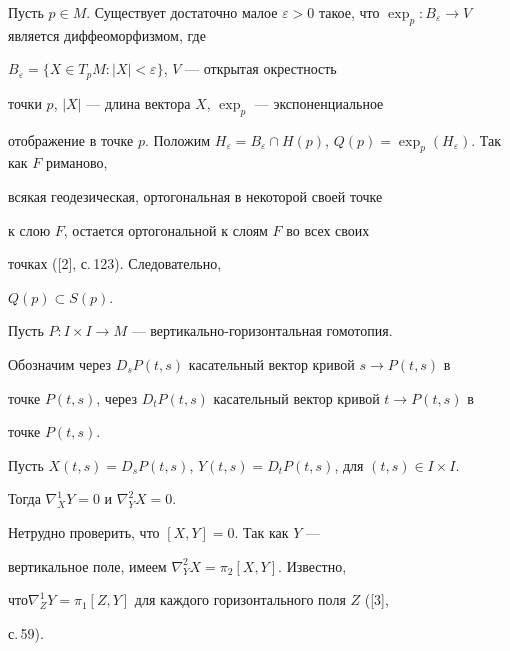 \begin{pf} Пусть $p\in M$. Существует достаточно малое $\varepsilon 


>0$ такое, что $\exp_p:B_\varepsilon \to V$ является диффеоморфизмом, где 


$B_\varepsilon =\{X\in T_pM: |X|<\varepsilon \}$, $V$ --- открытая окрестность 


точки $p$, $|X|$ --- длина вектора $X$, $\exp_p$ --- экспоненциальное 


отображение в точке $p$. Положим $H_\varepsilon = B_\varepsilon \cap 


H(p)$, $Q(p)= \exp_p (H_\varepsilon )$. Так как $F$ риманово,


всякая геодезическая, ортогональная в некоторой своей точке


к слою $F$, остается ортогональной к слоям $F$ во всех своих 


точках ([2], с.\,123). Следовательно, 


$Q(p)\subset S(p)$.


\end{pf}





Пусть $P:I\times I\to M$ --- вертикально-горизонтальная гомотопия. 


Обозначим через $D_sP(t,s)$ касательный вектор кривой $s\to P(t,s)$ в 


точке $P(t,s)$, через $D_tP(t,s)$ касательный вектор кривой $t\to P(t,s)$ в 


точке $P(t,s)$.





\begin{lem}


Пусть $X(t,s)=D_sP(t,s)$, $Y(t,s)=D_tP(t,s)$, для $(t,s)\in I\times I$. 


Тогда $\nabla_X^1Y = 0$ и $\nabla^2_YX=0$.


\end{lem}





\begin{pf}


Нетрудно проверить, что $[X,Y]=0$. Так как $Y$ ---


вертикальное поле, имеем $\nabla^2_YX=\pi_2[X,Y]$. Известно, 


что$\nabla^1_ZY=\pi_1[Z,Y]$ для каждого горизонтального поля $Z$ ([3], 


с.\,59).


\end{pf}






